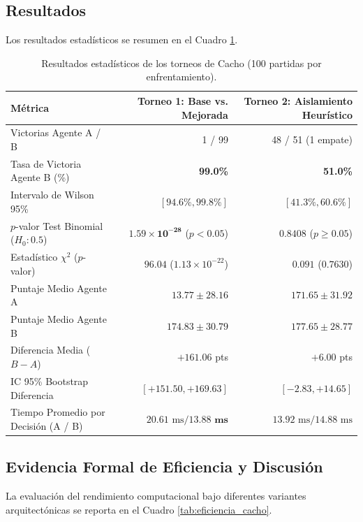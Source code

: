 \documentclass[10pt, a4paper]{article}
\begin{document}
\subsection{Resultados}
Los resultados estadísticos se resumen en el Cuadro \ref{tab:resultados_cacho}.

\begin{table}[htbp]
\centering
\small
\caption{Resultados estadísticos de los torneos de Cacho (100 partidas por enfrentamiento).}
\label{tab:resultados_cacho}
\begin{tabular}{lrr}
\toprule
\textbf{Métrica} & \textbf{Torneo 1: Base vs. Mejorada} & \textbf{Torneo 2: Aislamiento Heurístico} \\
\midrule
Victorias Agente A / B & 1 / 99 & 48 / 51 (1 empate) \\
Tasa de Victoria Agente B (\%) & \textbf{99.0\%} & \textbf{51.0\%} \\
Intervalo de Wilson 95\% & $[94.6\%, 99.8\%]$ & $[41.3\%, 60.6\%]$ \\
$p$-valor Test Binomial ($H_0: 0.5$) & $\mathbf{1.59 \times 10^{-28}}$ ($p < 0.05$) & $0.8408$ ($p \ge 0.05$) \\
Estadístico $\chi^2$ ($p$-valor) & $96.04$ ($1.13 \times 10^{-22}$) & $0.091$ ($0.7630$) \\
Puntaje Medio Agente A & $13.77 \pm 28.16$ & $171.65 \pm 31.92$ \\
Puntaje Medio Agente B & $\mathbf{174.83 \pm 30.79}$ & $\mathbf{177.65 \pm 28.77}$ \\
Diferencia Media ($B - A$) & $\mathbf{+161.06}$ pts & $\mathbf{+6.00}$ pts \\
IC 95\% Bootstrap Diferencia & $[+151.50, +169.63]$ & $[-2.83, +14.65]$ \\
Tiempo Promedio por Decisión (A / B) & $20.61\text{ ms} / \mathbf{13.88\text{ ms}}$ & $13.92\text{ ms} / 14.88\text{ ms}$ \\
\bottomrule
\end{tabular}
\end{table}

\subsection{Evidencia Formal de Eficiencia y Discusión}
La evaluación del rendimiento computacional bajo diferentes variantes arquitectónicas se reporta en el Cuadro \ref{tab:eficiencia_cacho}.
\end{document}
